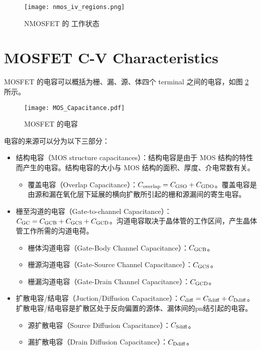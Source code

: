 \begin{figure}[!hbt]
    \centering
    \texttt{[image: nmos\_iv\_regions.png]}
    \caption{NMOSFET 的 工作状态}
    \label{fig:nmos_iv_regions}
\end{figure}

\section{MOSFET C-V Characteristics}

MOSFET 的电容可以概括为栅、漏、源、体四个 terminal 之间的电容，如图 \ref{fig:mosfet_capacitance} 所示。

\begin{figure}[!htb]
    \centering
    \texttt{[image: MOS\_Capacitance.pdf]}
    \caption{MOSFET 的电容\cite{CMOS-VLSI}}
    \label{fig:mosfet_capacitance}
\end{figure}

电容的来源可以分为以下三部分：
\begin{itemize}
    \item 结构电容（MOS structure capacitances）：结构电容是由于 MOS 结构的特性而产生的电容。结构电容的大小与 MOS 结构的面积、厚度、介电常数有关。
    \begin{itemize}
        \item 覆盖电容（Overlap Capacitance）：$C_{\rm{overlap}} = C_{\rm{GSO}} + C_{\rm{GDO}}$。覆盖电容是由源和漏在氧化层下延展的横向扩散所引起的栅和源漏间的寄生电容。
    \end{itemize}
    \item 栅至沟道的电容（Gate-to-channel Capacitance）：$C_{\rm{GC}} = C_{\rm{GCB}} + C_{\rm{GCS}} + C_{\rm{GCD}}$。沟道电容取决于晶体管的工作区间，产生晶体管工作所需的沟道电荷。
    \begin{itemize}
        \item 栅体沟道电容（Gate-Body Channel Capacitance）：$C_{\rm{GCB}}$。
        \item 栅源沟道电容（Gate-Source Channel Capacitance）：$C_{\rm{GCS}}$。
        \item 栅漏沟道电容（Gate-Drain Channel Capacitance）：$C_{\rm{GCD}}$。
    \end{itemize}
    \item 扩散电容/结电容（Juction/Diffusion Capacitance）：$C_{\rm{diff}} = C_{\rm{Sdiff}} + C_{\rm{Ddiff}}$。扩散电容/结电容是扩散区处于反向偏置的源体、漏体间的pn结引起的电容。
    \begin{itemize}
        \item 源扩散电容（Source Diffusion Capacitance）：$C_{\rm{Sdiff}}$。
        \item 漏扩散电容（Drain Diffusion Capacitance）：$C_{\rm{Ddiff}}$。
    \end{itemize}
\end{itemize}

